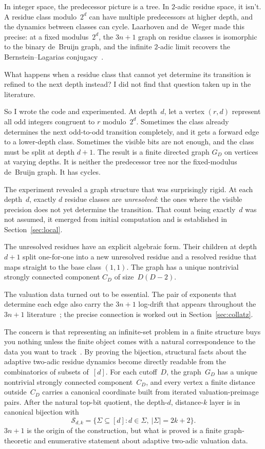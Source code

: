 \documentclass[11pt]{amsart}
\theoremstyle{definition}
\theoremstyle{remark}
\newcommand{\Sfam}{\mathcal S}
\begin{document}
In integer space, the predecessor picture is a tree.  In $2$-adic residue
space, it isn't.  A residue class modulo~$2^d$ can have multiple predecessors
at higher depth, and the dynamics between classes can cycle.  Laarhoven and
de~Weger made this precise: at a fixed modulus~$2^d$, the $3n+1$ graph on
residue classes is isomorphic to the binary de~Bruijn graph, and the infinite
$2$-adic limit recovers the Bernstein--Lagarias
conjugacy~\cite{LaarhovenDeWeger2013}.

What happens when a residue class that cannot yet determine its transition is
refined to the next depth instead?  I did not find that question taken up in
the literature.

So I wrote the code and experimented.  At depth~$d$, let a vertex $(r,d)$ represent all odd
integers congruent to $r$ modulo~$2^d$.  Sometimes the class already
determines the next odd-to-odd transition completely, and it gets a forward
edge to a lower-depth class.  Sometimes the visible bits are not enough, and
the class must be split at depth $d+1$.  The result is a finite directed graph
$G_D$ on vertices at varying depths.  It is neither the predecessor tree nor
the fixed-modulus de~Bruijn graph.  It has cycles.

The experiment revealed a graph structure that was surprisingly rigid.  At each 
depth~$d$, exactly $d$ residue classes are \emph{unresolved}: the ones where the visible 
precision does not yet determine the transition.  That count being exactly~$d$ was 
not assumed, it emerged from initial computation and is established in Section~\ref{sec:local}.

The unresolved residues have an explicit algebraic form.  Their
children at depth $d+1$ split one-for-one into a new unresolved residue and a
resolved residue that maps straight to the base class $(1,1)$.  The graph has
a unique nontrivial strongly connected component $C_D$ of
size~$D(D-2)$.

The valuation data turned out to be essential.  The pair of exponents that
determine each edge also carry the $3n+1$ log-drift that appears throughout
the $3n+1$ literature~\cite{Terras1976, Everett1977, Eliahou1993, Tao2022};
the precise connection is worked out in Section~\ref{sec:collatz}.

The concern is that representing an infinite-set problem in a finite structure 
buys you nothing unless the finite object comes with a natural correspondence 
to the data you want to track~\cite{Stanley2012, FlajoletSedgewick2009}.  By 
proving the bijection, structural facts about the adaptive two-adic residue 
dynamics become directly readable from the combinatorics of subsets of~$[d]$.  
For each cutoff~$D$, the graph~$G_D$ has a unique nontrivial strongly connected
component~$C_D$, and every vertex a finite distance outside~$C_D$ carries a 
canonical coordinate built from iterated valuation-preimage pairs.  After the 
natural top-bit quotient, the depth-$d$, distance-$k$ layer is in canonical bijection 
with
\[
\Sfam_{d,k}=\{\Sigma\subseteq[d]:d\in\Sigma,\ |\Sigma|=2k+2\}.
\]
$3n+1$ is the origin of the construction, but what is proved is a finite
graph-theoretic and enumerative statement about adaptive two-adic valuation
data.
\end{document}
